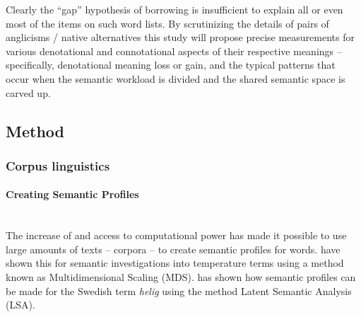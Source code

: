 \documentclass[a4paper]{article}
\begin{document}
Clearly the ``gap'' hypothesis of borrowing is insufficient to explain all or even most of the items on such word lists. 
By scrutinizing the details of pairs of anglicisms / native alternatives this study will propose precise measurements for various denotational and connotational aspects of their respective meanings -- specifically, denotational meaning loss or gain, and the typical patterns that occur when the semantic workload is divided and the shared semantic space is carved up.


\subsection{Method}


\subsubsection{Corpus linguistics}

\paragraph{Creating Semantic Profiles} \hspace{0pt} \\
The increase of and access to computational power has made it possible to use large amounts of texts -- corpora -- to create semantic profiles for words. 
\citet{Koptjevskaja-Tamm} have shown this for semantic investigations into temperature terms using a method known as Multidimensional Scaling (MDS). 
\citet{Sikstrom2012} has shown how semantic profiles can be made for the Swedish term \textit{helig} using the method Latent Semantic Analysis (LSA). 
\end{document}
